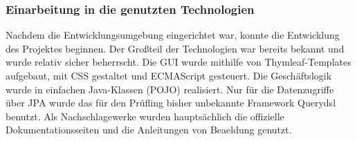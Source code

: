 \subsubsection{Einarbeitung in die genutzten Technologien}
\label{sec:Technologien}
Nachdem die Entwicklungsumgebung eingerichtet war, konnte die Entwicklung des Projektes beginnen. Der Großteil der Technologien war bereits bekannt und wurde relativ sicher beherrscht. Die \ac{GUI} wurde mithilfe von Thymleaf-Templates aufgebaut, mit CSS gestaltet und ECMAScript gesteuert. Die Geschäftslogik wurde in einfachen Java-Klassen (\ac{POJO}) realisiert. Nur für die Datenzugriffe über \ac{JPA} wurde das für den Prüfling bisher unbekannte Framework Querydsl benutzt. Als Nachschlagewerke wurden hauptsächlich die offizielle Dokumentationsseiten und die Anleitungen von Beaeldung genutzt.

